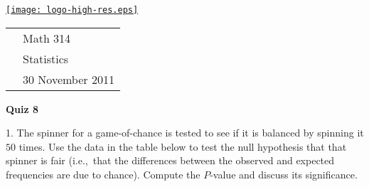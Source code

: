 \documentclass[10pt]{article}
\begin{document}
\pagestyle{empty}
\lstset{language=R, showspaces=false, showstringspaces=false}

\href{http://www.shepherd.edu}{\texttt{[image: logo-high-res.eps]}}
\vspace{-1.79cm}

{\small
\begin{tabular}{cl}
& Math 314\\
& Statistics\\
\hspace{5.28in} & 30 November 2011
\end{tabular}
}
\setlength{\baselineskip}{1.05\baselineskip}

\begin{center}
\textbf{\large  Quiz 8}
\end{center}

1. The spinner for a game-of-chance is tested to see if it is balanced
by spinning it $50$ times. 
Use the data in the table below to test the null hypothesis that that spinner is
fair (i.e.,~that the differences between the observed and expected frequencies are
due to chance). Compute the $P$-value and discuss its significance.
\end{document}
